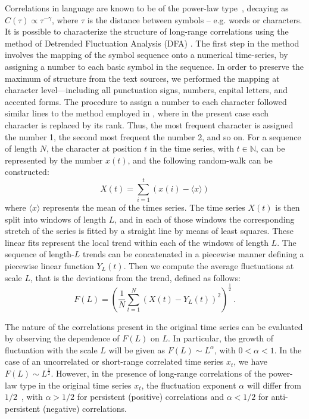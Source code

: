 \documentclass[journal]{IEEEtran}
\begin{document}
Correlations in language are known to be of the power-law
type~\cite{Ebeling1995, Montemurro2002, Altmann2012}, decaying as $C(\tau)
\propto \tau^{-\gamma}$, where $\tau$ is the distance between
symbols -- e.g. words or characters.
%
It is
possible to characterize the structure of long-range correlations using the
method of Detrended Fluctuation
Analysis (DFA) \cite{Peng1992, Buldyrev1995}.  The first step in the method
involves the
mapping of the symbol sequence onto a numerical time-series, by assigning a
number
to each basic symbol in the sequence. In order to preserve the maximum of
structure
from the text sources, we performed the mapping at character level---including
all punctuation signs, numbers, capital letters, and accented forms. The
procedure
to assign a number to each character followed similar lines to the method
employed in
\cite{Montemurro2002}, where in the present case each
character is replaced by its rank. Thus, the most frequent character is
assigned
the number 1, the second most frequent the number 2, and so on. For a sequence
of length $N$, the character at position $t$ in the time series, with $t\in
\mathbb{N}$, can be represented by the number $x(t)$, and the following
random-walk can be constructed:
%
\begin{equation}
 X(t)=\sum_{i=1}^t (x(i)-\langle x \rangle)
\end{equation}
where $\langle x \rangle$ represents the mean of the times series. The
time series $X(t)$
is then split into windows of length $L$, and in each of those windows the
corresponding stretch
of the series is fitted by a straight line by means of least squares. These
linear fits represent the
local trend within each of the windows of length $L$. The sequence of length-$L$ trends
can
be concatenated in a piecewise manner
defining a piecewise linear function $Y_L(t)$. Then we compute the average
fluctuations at scale $L$, that is the deviations from the trend, defined as
follows:
%
\begin{equation}
 F(L)=\left(\frac{1}{N}\sum_{t=1}^N \left(X(t)-Y_L(t)\right)^2 \right)^{\frac{1}{2}} \, .
\end{equation}

The nature of the correlations present in the original time series can be
evaluated by observing the dependence of $F(L)$ on $L$.
In particular, the growth of fluctuation with the scale $L$ will
be given as $F(L)\sim L^\alpha$, with $0<\alpha<1$. In the case of an
uncorrelated or short-range correlated
time series $x_t$, we have $F(L)\sim L^{\frac{1}{2}}$.
However, in the presence of long-range correlations of the
power-law type in the original time series $x_t$, the fluctuation
exponent $\alpha$ will differ from $1/2$~\cite{Buldyrev1995}, with
$\alpha>1/2$ for persistent (positive) correlations and $\alpha<1/2$ for
anti-persistent (negative) correlations.
\end{document}
